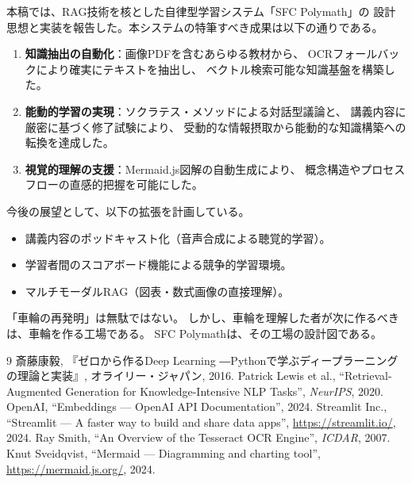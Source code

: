 \documentclass[uplatex, dvipdfmx, a4paper, 11pt]{jsarticle}
\begin{document}
本稿では、RAG技術を核とした自律型学習システム「SFC Polymath」の
設計思想と実装を報告した。本システムの特筆すべき成果は以下の通りである。

\begin{enumerate}
    \item \textbf{知識抽出の自動化}：画像PDFを含むあらゆる教材から、
          OCRフォールバックにより確実にテキストを抽出し、
          ベクトル検索可能な知識基盤を構築した。
    \item \textbf{能動的学習の実現}：ソクラテス・メソッドによる対話型議論と、
          講義内容に厳密に基づく修了試験により、
          受動的な情報摂取から能動的な知識構築への転換を達成した。
    \item \textbf{視覚的理解の支援}：Mermaid.js図解の自動生成により、
          概念構造やプロセスフローの直感的把握を可能にした。
\end{enumerate}

今後の展望として、以下の拡張を計画している。
\begin{itemize}
    \item 講義内容のポッドキャスト化（音声合成による聴覚的学習）。
    \item 学習者間のスコアボード機能による競争的学習環境。
    \item マルチモーダルRAG（図表・数式画像の直接理解）。
\end{itemize}

「車輪の再発明」は無駄ではない。
しかし、車輪を理解した者が次に作るべきは、車輪を作る工場である。
SFC Polymathは、その工場の設計図である。

\begin{thebibliography}{9}
   斎藤康毅, 『ゼロから作るDeep Learning ―Pythonで学ぶディープラーニングの理論と実装』, オライリー・ジャパン, 2016.
   Patrick Lewis et al., ``Retrieval-Augmented Generation for Knowledge-Intensive NLP Tasks'', \textit{NeurIPS}, 2020.
   OpenAI, ``Embeddings --- OpenAI API Documentation'', 2024.
   Streamlit Inc., ``Streamlit --- A faster way to build and share data apps'', \url{https://streamlit.io/}, 2024.
   Ray Smith, ``An Overview of the Tesseract OCR Engine'', \textit{ICDAR}, 2007.
   Knut Sveidqvist, ``Mermaid --- Diagramming and charting tool'', \url{https://mermaid.js.org/}, 2024.
\end{thebibliography}
\end{document}
